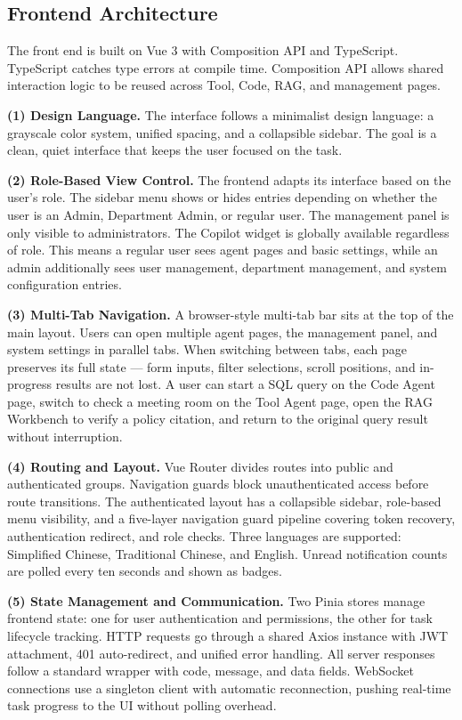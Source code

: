 \subsection{Frontend Architecture}

The front end is built on Vue 3 with Composition API and TypeScript. TypeScript catches type errors at compile time. Composition API allows shared interaction logic to be reused across Tool, Code, RAG, and management pages.

\textbf{(1) Design Language.} The interface follows a minimalist design language: a grayscale color system, unified spacing, and a collapsible sidebar. The goal is a clean, quiet interface that keeps the user focused on the task.

\textbf{(2) Role-Based View Control.} The frontend adapts its interface based on the user's role. The sidebar menu shows or hides entries depending on whether the user is an Admin, Department Admin, or regular user. The management panel is only visible to administrators. The Copilot widget is globally available regardless of role. This means a regular user sees agent pages and basic settings, while an admin additionally sees user management, department management, and system configuration entries.

\textbf{(3) Multi-Tab Navigation.} A browser-style multi-tab bar sits at the top of the main layout. Users can open multiple agent pages, the management panel, and system settings in parallel tabs. When switching between tabs, each page preserves its full state --- form inputs, filter selections, scroll positions, and in-progress results are not lost. A user can start a SQL query on the Code Agent page, switch to check a meeting room on the Tool Agent page, open the RAG Workbench to verify a policy citation, and return to the original query result without interruption.

\textbf{(4) Routing and Layout.} Vue Router divides routes into public and authenticated groups. Navigation guards block unauthenticated access before route transitions. The authenticated layout has a collapsible sidebar, role-based menu visibility, and a five-layer navigation guard pipeline covering token recovery, authentication redirect, and role checks. Three languages are supported: Simplified Chinese, Traditional Chinese, and English. Unread notification counts are polled every ten seconds and shown as badges.

\textbf{(5) State Management and Communication.} Two Pinia stores manage frontend state: one for user authentication and permissions, the other for task lifecycle tracking. HTTP requests go through a shared Axios instance with JWT attachment, 401 auto-redirect, and unified error handling. All server responses follow a standard wrapper with code, message, and data fields. WebSocket connections use a singleton client with automatic reconnection, pushing real-time task progress to the UI without polling overhead.

